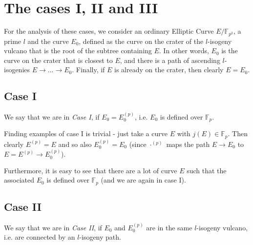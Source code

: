 \documentclass{scrartcl}
\newcommand{\F}{\mathbb{F}}
\theoremstyle{definition}
\begin{document}
\section{The cases I, II and III}
For the analysis of these cases, we consider an ordinary Elliptic Curve $E/\F_{p^2}$, a prime $l$ and the curve $E_0$, defined as the curve on the crater of the $l$-isogeny vulcano that is the root of the subtree containing $E$.
In other words, $E_0$ is the curve on the crater that is closest to $E$, and there is a path of ascending $l$-isogenies $E \to ... \to E_0$.
Finally, if $E$ is already on the crater, then clearly $E = E_0$.

\subsection{Case I}
We say that we are in \emph{Case I}, if $E_0 = E_0^{(p)}$, i.e. $E_0$ is defined over $\F_p$.

Finding examples of case I is trivial - just take a curve $E$ with $j(E) \in \F_p$.
Then clearly $E^{(p)} = E$ and so also $E_0^{(p)} = E_0$ (since $\cdot^{(p)}$ maps the path $E \to E_0$ to $E = E^{(p)} \to E_0^{(p)}$).

Furthermore, it is easy to see that there are a lot of curve $E$ such that the associated $E_0$ is defined over $\F_p$ (and we are again in case I).

\subsection{Case II}
We say that we are in \emph{Case II}, if $E_0$ and $E_0^{(p)}$ are in the same $l$-isogeny vulcano, i.e. are connected by an $l$-isogeny path.
\end{document}
